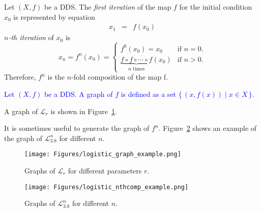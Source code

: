 \begin{definition}
    Let $\left( X, f \right)$ be a DDS. 
    The \emph{first iteration} of the map $f$ for the initial condition $x_0$ is represented by equation
    \begin{eqnarray}
        x_{1}  & = & f(x_{0})
    \end{eqnarray}
    \emph{$n$-th iteration} of $x_0$ is
    \begin{equation}
    x_{n} = f^{n}(x_0) =
        \begin{cases}
            f^{0}(x_0) = x_0 & \text{if } n = 0. \\
            \underbrace{f \circ f \circ \cdots \circ f}_\text{$n$ times}(x_0) & \text{if } n > 0. 
        \end{cases}
    \end{equation}
    Therefore, $f^{n}$ is the $n$-fold composition of the map f.
\end{definition}

\begin{definition}[Graph]
\textcolor{blue}{
    Let $\left( X, f \right)$ be a DDS. A graph of $f$ is defined as a set $\{\, (x, f(x)) \mid x \in X \,\}$.
}
\end{definition}

\begin{remark}
    A graph of $\mathcal{L}_{r}$ is shown in Figure~\ref{fig:logistic_graph_example}.
    \par
    It is sometimes useful to generate the graph of $f^{n}$.
    Figure~\ref{fig:logistic_nthcomp_example} shows an example of the graph of $\mathcal{L}_{3.8}^{n}$ for different $n$.
\end{remark}

\begin{figure}[!h]
    \centering
    \texttt{[image: Figures/logistic\_graph\_example.png]}
    \caption{
        Graphs of $\mathcal{L}_{r}$ for different parameters $r$.
    }
    \label{fig:logistic_graph_example}
\end{figure}

\begin{figure}[!h]
    \centering
    \texttt{[image: Figures/logistic\_nthcomp\_example.png]}
    \caption{
        Graphs of $\mathcal{L}_{3.8}^{n}$ for different $n$.
    }
    \label{fig:logistic_nthcomp_example}
\end{figure}

